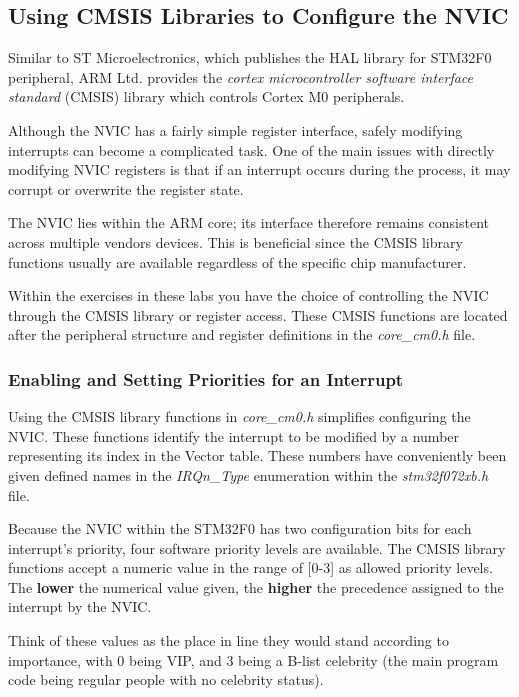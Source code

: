 \documentclass[openany,11pt,fleqn]{book} %
\begin{document}
 
\subsection{Using CMSIS Libraries to Configure the NVIC}
Similar to ST Microelectronics, which publishes the HAL library for STM32F0 peripheral, ARM Ltd. provides the \textit{cortex microcontroller software interface standard} (CMSIS) library which controls Cortex M0 peripherals. 

Although the NVIC has a fairly simple register interface, safely modifying interrupts can become a complicated task. One of the main issues with directly modifying NVIC registers is that if an interrupt occurs during the process, it may corrupt or overwrite the register state.  

The NVIC lies within the ARM core; its interface therefore remains consistent across multiple vendors devices. This is beneficial since the CMSIS library functions usually are available regardless of the specific chip manufacturer. 

Within the exercises in these labs you have the choice of controlling the NVIC through the CMSIS library or register access. These CMSIS functions are located after the peripheral structure and register definitions in the \textit{core\_cm0.h} file. 

\subsubsection{Enabling and Setting Priorities for an Interrupt}

Using the CMSIS library functions in \textit{core\_cm0.h} simplifies configuring the NVIC. These functions identify the interrupt to be modified by a number representing its index in the Vector table. These numbers have conveniently been given defined names in the \textit{IRQn\_Type} enumeration within the \textit{stm32f072xb.h} file.  

Because the NVIC within the STM32F0 has two configuration bits for each interrupt's priority, four software priority levels are available. The CMSIS library functions accept a numeric value in the range of [0-3] as allowed priority levels. The \textbf{lower} the numerical value given, the \textbf{higher} the precedence assigned to the interrupt by the NVIC.

Think of these values as the place in line they would stand according to importance, with 0 being VIP, and 3 being a B-list celebrity (the main program code being regular people with no celebrity status).
\end{document}
